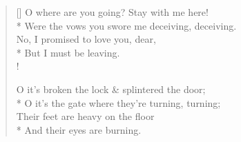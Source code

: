 \documentclass[MAIN]{subfiles}
\begin{document}
\begin{verse}[\versewidth]
O where are you going? Stay with me here!\\*
\vin Were the vows you swore me deceiving, deceiving.\\
No, I promised to love you, dear,\\*
\vin \vin But I must be leaving.\\!

O it's broken the lock \& splintered the door;\\*
\vin O it's the gate where they're turning, turning;\\
Their feet are heavy on the floor\\*
\vin \vin And their eyes are burning.
\end{verse}
\end{document}
